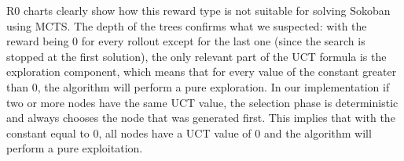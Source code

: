 \begin{figure}[!h]
\centering
{}
\caption[R0 solved levels rate and tree depth]{}
\label{fig:constant_R0}
\end{figure}

\medskip\noindent
R0 charts clearly show how this reward type is not suitable for solving Sokoban using MCTS. The depth of the trees confirms what we suspected: with the reward being 0 for every rollout except for the last one (since the search is stopped at the first solution), the only relevant part of the UCT formula is the exploration component, which means that for every value of the constant greater than 0, the algorithm will perform a pure exploration. In our implementation if two or more nodes have the same UCT value, the selection phase is deterministic and always chooses the node that was generated first. This implies that with the constant equal to 0, all nodes have a UCT value of 0 and the algorithm will perform a pure exploitation.

